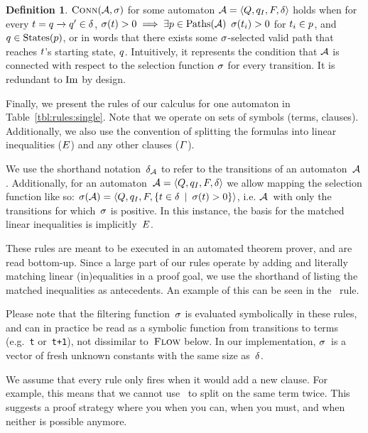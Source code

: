 \documentclass[acmsmall,review,anonymous]{acmart}\settopmatter{printfolios=true,printccs=false,printacmref=true}
\theoremstyle{definition}
\newtheorem{definition}{Definition}[section]
\begin{document}
\begin{definition}
  $\operatorname{\textsc{Conn}}(\mathcal{A}, \operatorname{\sigma})$ for some automaton $\mathcal{A} =
  \left\langle Q, q_I, F, \delta\right\rangle$ holds when for every $t =
  q \xrightarrow{} q' \in \delta$, $\operatorname{\sigma}(t) > 0
  \implies \exists p \in \operatorname{Paths}(\mathcal{A})$ $\operatorname{\sigma}(t_i) > 0$
  for $t_i \in p$, and $q \in \operatorname{States}(p)$, or in words that
  there exists some $\operatorname{\sigma}$-selected valid path that reaches $t$'s
  starting state, $q$. Intuitively, it represents the condition that
  $\mathcal{A}$ is connected with respect to the selection function $\operatorname{\sigma}$ for
  every transition. It is redundant to $\operatorname{Im}$ by design.
\end{definition}

Finally, we present the rules of our calculus for one automaton in Table~\ref{tbl:rules:single}. Note that we
operate on sets of symbols (terms, clauses). Additionally, we also use the
convention of splitting the formulas into linear inequalities ($E$)
and any other clauses ($\varGamma$).

We use the shorthand notation~$\delta_{\mathcal{A}}$ to refer to the
transitions of an automaton~$\mathcal{A}$. Additionally, for an
automaton~$\mathcal{A} = \left\langle Q, q_I, F, \delta\right\rangle$ we allow mapping the selection function
like so: $\operatorname{\sigma}(\mathcal{A}) = \left\langle Q, q_I, F,
\left\{t \in \delta \:\mid\: \operatorname{\sigma}(t) > 0\right\}\right\rangle$, i.e.
$\mathcal{A}$~with only the transitions for which~$\operatorname{\sigma}$ is positive. In this
instance, the basis for the matched linear inequalities is
implicitly~$E$.

These rules are meant to be executed in an automated theorem prover, and are
read bottom-up. Since a large part of our rules operate by adding and literally
matching linear (in)equalities in a proof goal, we use the shorthand of listing
the matched inequalities as antecedents. An example of this can be seen in
the~\Propagate{} rule.

Please note that the filtering function~$\operatorname{\sigma}$ is evaluated symbolically in
these rules, and can in practice be read as a symbolic function from transitions
to terms (e.g.~\texttt{t} or~\texttt{t+1}), not dissimilar to~$\textsc{Flow}$ below.
In our implementation, $\operatorname{\sigma}$~is a vector of fresh unknown constants with the
same size as~$\delta$.

We assume that every rule only fires when it would add a new clause. For
example, this means that we cannot use~\Split{} to split on the same term twice.
This suggests a proof strategy where you \Propagate{} when you can, \Split{}
when you must, and \Subsume{} when neither is possible anymore.
\end{document}
